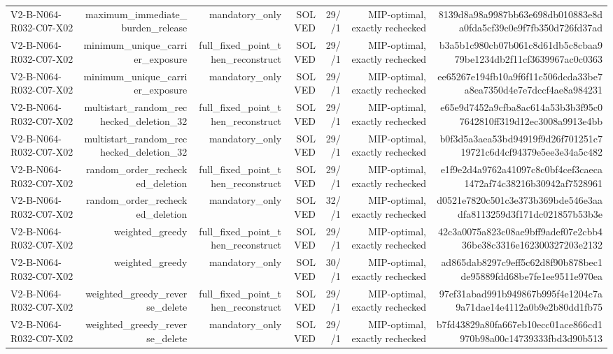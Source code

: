{\begin{longtable}{lrrrrrr}
V2-B-N064-R032-C07-X02 & maximum\_immediate\_burden\_release & mandatory\_only & SOLVED & 29//1 & MIP-optimal, exactly rechecked & 8139d8a98a9987bb63e698db010883e8da0fda5cf39c0e9f7fb350d726fd37ad \\
V2-B-N064-R032-C07-X02 & minimum\_unique\_carrier\_exposure & full\_fixed\_point\_then\_reconstruct & SOLVED & 29//1 & MIP-optimal, exactly rechecked & b3a5b1c980cb07b061c8d61db5c8cbaa979be1234db2f11cf3639967ac0c0363 \\
V2-B-N064-R032-C07-X02 & minimum\_unique\_carrier\_exposure & mandatory\_only & SOLVED & 29//1 & MIP-optimal, exactly rechecked & ee65267e194fb10a9f6f11c506dcda33be7a8ea7350d4e7e7dccf4ae8a984231 \\
V2-B-N064-R032-C07-X02 & multistart\_random\_rechecked\_deletion\_32 & full\_fixed\_point\_then\_reconstruct & SOLVED & 29//1 & MIP-optimal, exactly rechecked & e65e9d7452a9cfba8ac614a53b3b3f95c07642810ff319d12ec3008a9913e4bb \\
V2-B-N064-R032-C07-X02 & multistart\_random\_rechecked\_deletion\_32 & mandatory\_only & SOLVED & 29//1 & MIP-optimal, exactly rechecked & b0f3d5a3aea53bd94919f9d26f701251c719721c6d4cf94379e5ee3e34a5c482 \\
V2-B-N064-R032-C07-X02 & random\_order\_rechecked\_deletion & full\_fixed\_point\_then\_reconstruct & SOLVED & 29//1 & MIP-optimal, exactly rechecked & e1f9e2d4a9762a41097c8c0bf4cef3caeca1472af74c38216b30942af7528961 \\
V2-B-N064-R032-C07-X02 & random\_order\_rechecked\_deletion & mandatory\_only & SOLVED & 32//1 & MIP-optimal, exactly rechecked & d0521e7820c501c3e373b369bde546e3aadfa8113259d3f171dc021857b53b3e \\
V2-B-N064-R032-C07-X02 & weighted\_greedy & full\_fixed\_point\_then\_reconstruct & SOLVED & 29//1 & MIP-optimal, exactly rechecked & 42c3a0075a823c08ae9bff9adef07e2cbb436be38c3316e162300327203e2132 \\
V2-B-N064-R032-C07-X02 & weighted\_greedy & mandatory\_only & SOLVED & 30//1 & MIP-optimal, exactly rechecked & ad865dab8297c9eff5c62d8f90b878bec1de95889fdd68be7fe1ee9511e970ea \\
V2-B-N064-R032-C07-X02 & weighted\_greedy\_reverse\_delete & full\_fixed\_point\_then\_reconstruct & SOLVED & 29//1 & MIP-optimal, exactly rechecked & 97ef31abad991b949867b995f4e1204c7a9a71dae14e4112a0b9e2b80dd1fb75 \\
V2-B-N064-R032-C07-X02 & weighted\_greedy\_reverse\_delete & mandatory\_only & SOLVED & 29//1 & MIP-optimal, exactly rechecked & b7fd43829a80fa667eb10ecc01ace866cd1970b98a00c14739333fbd3d90b513 \\

\end{longtable}}
